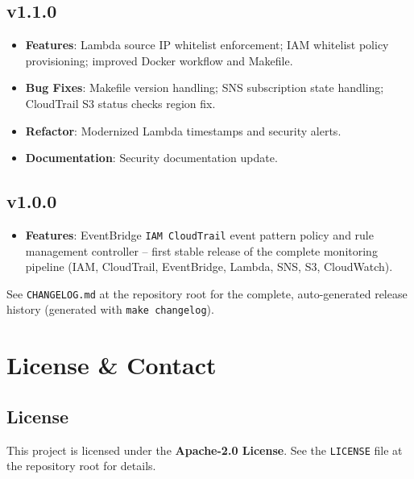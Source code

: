 \documentclass[11pt,a4paper]{report}
\begin{document}
\section{v1.1.0}

\begin{itemize}[leftmargin=1.4em]
  \item \textbf{Features}: Lambda source IP whitelist enforcement; IAM whitelist policy provisioning; improved Docker workflow and Makefile.
  \item \textbf{Bug Fixes}: Makefile version handling; SNS subscription state handling; CloudTrail S3 status checks region fix.
  \item \textbf{Refactor}: Modernized Lambda timestamps and security alerts.
  \item \textbf{Documentation}: Security documentation update.
\end{itemize}

\section{v1.0.0}

\begin{itemize}[leftmargin=1.4em]
  \item \textbf{Features}: EventBridge \texttt{IAM CloudTrail} event pattern policy and rule management controller -- first stable release of the complete monitoring pipeline (IAM, CloudTrail, EventBridge, Lambda, SNS, S3, CloudWatch).
\end{itemize}

\begin{notebox}[Note]
See \texttt{CHANGELOG.md} at the repository root for the complete,
auto-generated release history (generated with \texttt{make changelog}).
\end{notebox}

\chapter*{License \& Contact}

\section*{License}

This project is licensed under the \textbf{Apache-2.0 License}. See the
\texttt{LICENSE} file at the repository root for details.
\end{document}
